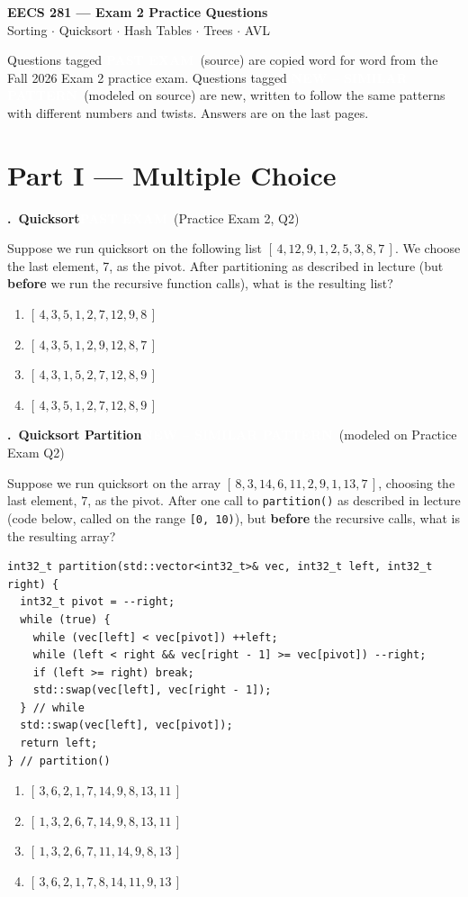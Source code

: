 \documentclass[11pt]{article}
\newcounter{qnum}
\newcommand{\tagpast}[1]{\colorbox{pastc}{\textcolor{white}{\footnotesize\textbf{PAST EXAM}}}\ {\footnotesize\textcolor{pastc}{(#1)}}}
\newcommand{\tagnew}[1]{\colorbox{newc}{\textcolor{white}{\footnotesize\textbf{NEW -- SIMILAR PATTERN}}}\ {\footnotesize\textcolor{newc}{(modeled on #1)}}}
\newcommand{\question}[2]{\par\needspace{8\baselineskip}\medskip\stepcounter{qnum}%
  \noindent\textbf{\theqnum.\ #1}\hfill #2\par\nobreak\smallskip}
\newenvironment{choices}{\begin{enumerate}[label=\textbf{\Alph*)}, nosep, leftmargin=2.5em]}{\end{enumerate}}
\begin{document}
\begin{center}
{\Large\textbf{EECS 281 --- Exam 2 Practice Questions}}\\[3pt]
Sorting $\cdot$ Quicksort $\cdot$ Hash Tables $\cdot$ Trees $\cdot$ AVL
\end{center}

\noindent Questions tagged \tagpast{source} are copied word for word from the Fall 2026 Exam 2 practice exam.
Questions tagged \tagnew{source} are new, written to follow the same patterns with different numbers and twists.
Answers are on the last pages.

\section*{Part I --- Multiple Choice}

\question{Quicksort}{\tagpast{Practice Exam 2, Q2}}
Suppose we run quicksort on the following list $[\,4, 12, 9, 1, 2, 5, 3, 8, 7\,]$. We choose the last element, 7,
as the pivot. After partitioning as described in lecture (but \textbf{before} we run the recursive function calls),
what is the resulting list?
\begin{choices}
  \item $[\,4, 3, 5, 1, 2, 7, 12, 9, 8\,]$
  \item $[\,4, 3, 5, 1, 2, 9, 12, 8, 7\,]$
  \item $[\,4, 3, 1, 5, 2, 7, 12, 8, 9\,]$
  \item $[\,4, 3, 5, 1, 2, 7, 12, 8, 9\,]$
\end{choices}

\question{Quicksort Partition}{\tagnew{Practice Exam Q2}}
Suppose we run quicksort on the array $[\,8, 3, 14, 6, 11, 2, 9, 1, 13, 7\,]$, choosing the last element, $7$, as the pivot.
After one call to \texttt{partition()} as described in lecture (code below, called on the range \texttt{[0, 10)}),
but \textbf{before} the recursive calls, what is the resulting array?
\begin{lstlisting}
int32_t partition(std::vector<int32_t>& vec, int32_t left, int32_t right) {
  int32_t pivot = --right;
  while (true) {
    while (vec[left] < vec[pivot]) ++left;
    while (left < right && vec[right - 1] >= vec[pivot]) --right;
    if (left >= right) break;
    std::swap(vec[left], vec[right - 1]);
  } // while
  std::swap(vec[left], vec[pivot]);
  return left;
} // partition()
\end{lstlisting}
\begin{choices}
  \item $[\,3, 6, 2, 1, 7, 14, 9, 8, 13, 11\,]$
  \item $[\,1, 3, 2, 6, 7, 14, 9, 8, 13, 11\,]$
  \item $[\,1, 3, 2, 6, 7, 11, 14, 9, 8, 13\,]$
  \item $[\,3, 6, 2, 1, 7, 8, 14, 11, 9, 13\,]$
\end{choices}
\end{document}
